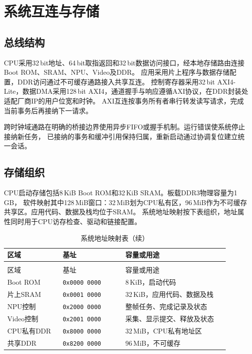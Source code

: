 \section{系统互连与存储}

\subsection{总线结构}

CPU采用32\,bit地址、64\,bit取指返回和32\,bit数据访问接口，经本地存储路由连接Boot ROM、SRAM、NPU、Video及DDR。
应用采用片上程序与数据存储配置，DDR访问通过不可缓存通路接入共享互连。
控制寄存器采用32\,bit AXI4-Lite，数据DMA采用128\,bit AXI4，通道握手与响应遵循AXI协议\cite{arm-axi-ihi0022e}，在DDR封装处适配厂商IP的用户位宽和时钟。
AXI互连按事务所有者串行转发读写请求，完成当前事务后再接纳下一请求。

跨时钟域通路在明确的桥接边界使用异步FIFO或握手机制。运行错误使系统停止接纳新任务，
已接纳的事务和缓冲引用保持归属，重新启动通过协调复位建立统一会话。

\subsection{存储组织}

CPU启动存储包括8\,KiB Boot ROM和32\,KiB SRAM。板载DDR3物理容量为1\,GB，
软件映射其中128\,MiB窗口：32\,MiB划为CPU私有区，96\,MiB作为不可缓存共享区。应用代码、数据及栈均位于SRAM。
系统地址映射按下表组织，地址属性同时用于CPU访存检查、驱动和链接配置。

\begin{reporttable}
\begin{longtable}{@{}p{0.23\linewidth}p{0.26\linewidth}p{0.43\linewidth}@{}}
\caption{系统地址映射表}\\
\toprule
区域 & 基址 & 容量或用途 \\
\midrule
\endfirsthead
\caption[]{系统地址映射表（续）}\\
\toprule
区域 & 基址 & 容量或用途 \\
\midrule
\endhead
\bottomrule
\endfoot
Boot ROM & \texttt{0x0000\,0000} & 8\,KiB，启动代码 \\
片上SRAM & \texttt{0x0001\,0000} & 32\,KiB，应用代码、数据及栈 \\
NPU控制 & \texttt{0x2000\,0000} & 整帧任务、完成记录及状态 \\
Video控制 & \texttt{0x2001\,0000} & 采集、显示提交、释放及状态 \\
CPU私有DDR & \texttt{0x8000\,0000} & 32\,MiB，CPU私有地址区 \\
共享DDR & \texttt{0x8200\,0000} & 96\,MiB，不可缓存 \\
\end{longtable}
\end{reporttable}

